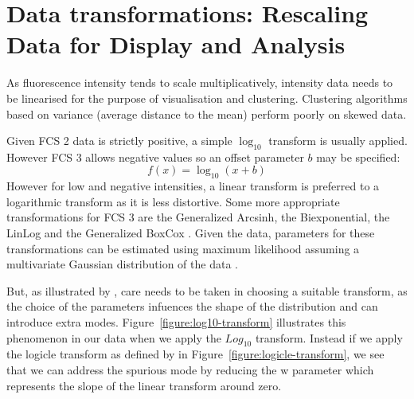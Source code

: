 \chapter{\label{appendix:transformation}Data transformations: Rescaling Data for Display and Analysis}


As fluorescence intensity tends to scale multiplicatively, intensity data needs to be linearised for the purpose of visualisation and clustering.
Clustering algorithms based on variance (average distance to the mean) perform poorly on skewed data. 


Given FCS 2 data is strictly positive, a simple $\log_{10}$ transform is usually applied.
However FCS 3 allows negative values so an offset parameter $b$ may be specified:
\[
    f(x) = \log_{10}(x+b)
\]
However for low and negative intensities, a linear transform is preferred to a logarithmic transform \citep{Tung:2006uw} as it is less distortive.
Some more appropriate transformations for FCS 3 are the Generalized Arcsinh, the Biexponential, the LinLog and the Generalized BoxCox
\citep{Bagwell:2005he,Parks:2006gaa,Finak:2010is}.
Given the data, parameters for these transformations can be estimated using maximum likelihood assuming a multivariate Gaussian distribution of the data \citep{Finak:2010is}. 



But, as illustrated by \citet{Tung:2006uw}, care needs to be taken in choosing a suitable transform, as the choice of the parameters
infuences the shape of the distribution and can introduce extra modes.
Figure~\ref{figure:log10-transform} illustrates this phenomenon in our data when we apply the $Log_{10}$ transform.
Instead if we apply the logicle transform as defined by \citet{Parks:2006gaa} in Figure~\ref{figure:logicle-transform}, we see that we can address the spurious mode
by reducing the w parameter which represents the slope of the linear transform around zero.

